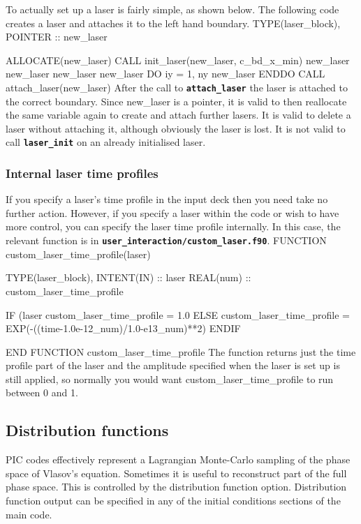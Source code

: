 \documentclass[12pt,a4paper]{article}
\newcommand{\inlinecode}[1]{{\color{warwickred} \bf\texttt{#1}}}
\newenvironment{boxverbatim}{\lboxverbatim{none}}{\endlboxverbatim}
\begin{document}
To actually set up a laser is fairly simple, as shown below. The following
code creates a laser and attaches it to the left hand boundary.
\begin{boxverbatim}
TYPE(laser_block), POINTER :: new_laser

ALLOCATE(new_laser)
CALL init_laser(new_laser, c_bd_x_min)
new_laser%
new_laser%
new_laser%
new_laser%
DO iy = 1, ny
  new_laser%
ENDDO
CALL attach_laser(new_laser)
\end{boxverbatim}
After the call to \inlinecode{attach\_laser} the laser is attached to the
correct boundary. Since new\_laser is a pointer, it is valid to then reallocate
the same variable again to create and attach further lasers. It is valid to
delete a laser without attaching it, although obviously the laser is lost. It
is not valid to call \inlinecode{laser\_init} on an already initialised laser.

\subsubsection{Internal laser time profiles}
If you specify a laser's time profile in the input deck then you need take no
further action. However, if you specify a laser within the code or wish to
have more control, you can specify the laser time profile internally. In this
case, the relevant function is in
\inlinecode{user\_interaction/custom\_laser.f90}.
\begin{boxverbatim}
FUNCTION custom_laser_time_profile(laser)

  TYPE(laser_block), INTENT(IN) :: laser
  REAL(num) :: custom_laser_time_profile

  IF (laser%
    custom_laser_time_profile = 1.0
  ELSE
    custom_laser_time_profile = EXP(-((time-1.0e-12_num)/1.0-e13_num)**2)
  ENDIF

END FUNCTION custom_laser_time_profile
\end{boxverbatim}
The function returns just the time profile part of the laser and the
amplitude specified when the laser is set up is still applied, so normally you
would want custom\_laser\_time\_profile to run between 0 and 1.

\subsection{Distribution functions}
PIC codes effectively represent a Lagrangian Monte-Carlo sampling of the phase
space of Vlasov's equation. Sometimes it is useful to reconstruct part of the
full phase space. This is controlled by the distribution function option.
Distribution function output can be specified in any of the initial conditions
sections of the main code.
\end{document}
